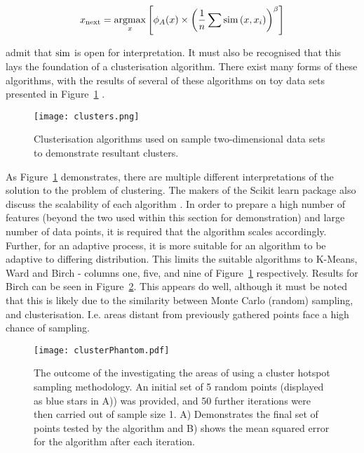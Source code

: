 \begin{equation}
    \label{eq:Settles_density}
    x_\mathrm{next}=\operatorname*{argmax}_x{\left[\phi_A(x)\times{\left(\frac{1}{n}\sum{\operatorname*{sim}{(x, x_i)}}\right)}^\beta\right]}
\end{equation}

\textcite{Set08} admit that $\operatorname*{sim}$ is open for interpretation. It must also be recognised that this lays the foundation of a clusterisation algorithm. There exist many forms of these algorithms, with the results of several of these algorithms on toy data sets presented in Figure~\ref{fig:ClusterResults} \cite{SciClus}.

\begin{figure}[H]
    \begin{center}
        \texttt{[image: clusters.png]}
        \caption[Comparison of Clusterisation Algorithms]{Clusterisation algorithms used on sample two-dimensional data sets to demonstrate resultant clusters.}
        \label{fig:ClusterResults}
    \end{center}
\end{figure}

As Figure~\ref{fig:ClusterResults} demonstrates, there are multiple different interpretations of the solution to the problem of clustering. The makers of the Scikit learn package also discuss the scalability of each algorithm \cite{SciClus}. In order to prepare a high number of features (beyond the two used within this section for demonstration) and large number of data points, it is required that the algorithm scales accordingly. Further, for an adaptive process, it is more suitable for an algorithm to be adaptive to differing distribution. This limits the suitable algorithms to K-Means, Ward and Birch - columns one, five, and nine of Figure~\ref{fig:ClusterResults} respectively. Results for Birch can be seen in Figure~\ref{fig:clusterPhantom}. This appears do well, although it must be noted that this is likely due to the similarity between Monte Carlo (random) sampling, and clusterisation. I.e. areas distant from previously gathered points face a high chance of sampling.

\begin{figure}[H]
    \begin{center}
        \texttt{[image: clusterPhantom.pdf]}
        \caption[Cluster Hotspot Sampling Illustration]{The outcome of the investigating the areas of using a cluster hotspot sampling methodology. An initial set of 5 random points (displayed as blue stars in A)) was provided, and 50 further iterations were then carried out of sample size 1. A) Demonstrates the final set of points tested by the algorithm and B) shows the mean squared error for the algorithm after each iteration.}
        \label{fig:clusterPhantom}
    \end{center}
\end{figure}

